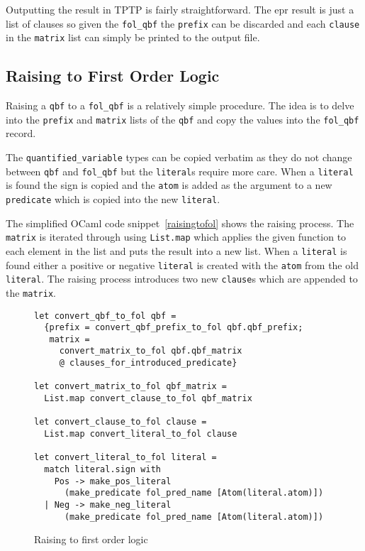Outputting the result in TPTP is fairly straightforward. The \gls{epr} result is just a list of clauses so given the \texttt{fol\_qbf} the \texttt{prefix} can be discarded and each \texttt{clause} in the \texttt{matrix} list can simply be printed to the output file.

\subsection{Raising to First Order Logic}
Raising a \texttt{qbf} to a \texttt{fol\_qbf} is a relatively simple procedure. The idea is to delve into the \texttt{prefix} and \texttt{matrix} lists of the \texttt{qbf} and copy the values into the \texttt{fol\_qbf} record.

The \texttt{quantified\_variable} types can be copied verbatim as they do not change between \texttt{qbf} and \texttt{fol\_qbf} but the \texttt{literal}s require more care. When a \texttt{literal} is found the sign is copied and the \texttt{atom} is added as the argument to a new \texttt{predicate} which is copied into the new \texttt{literal}.

The simplified OCaml code snippet~\ref{raisingtofol} shows the raising process. The \texttt{matrix} is iterated through using \texttt{List.map} which applies the given function to each element in the list and puts the result into a new list. When a \texttt{literal} is found either a positive or negative \texttt{literal} is created with the \texttt{atom} from the old \texttt{literal}. The raising process introduces two new \texttt{clause}s which are appended to the \texttt{matrix}.

\begin{figure}[H]
\caption{Raising to first order logic}
\begin{CenteredBox}
\begin{lstlisting}[language=caml, label=raisingtofol]
let convert_qbf_to_fol qbf =
  {prefix = convert_qbf_prefix_to_fol qbf.qbf_prefix;
   matrix = 
     convert_matrix_to_fol qbf.qbf_matrix 
     @ clauses_for_introduced_predicate}

let convert_matrix_to_fol qbf_matrix =
  List.map convert_clause_to_fol qbf_matrix

let convert_clause_to_fol clause =
  List.map convert_literal_to_fol clause

let convert_literal_to_fol literal =
  match literal.sign with
    Pos -> make_pos_literal 
      (make_predicate fol_pred_name [Atom(literal.atom)])
  | Neg -> make_neg_literal 
      (make_predicate fol_pred_name [Atom(literal.atom)])
\end{lstlisting}
\end{CenteredBox}
\end{figure}

